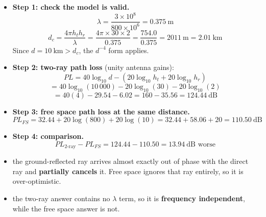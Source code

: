 \begin{itemize}
  \item \textbf{Step 1: check the model is valid.}
        \[ \lambda = \frac{3\times10^{8}}{800\times10^{6}} = 0.375\ \text{m} \]
        \[ d_c = \frac{4\pi h_t h_r}{\lambda} = \frac{4\pi \times 30 \times 2}{0.375}
              = \frac{754.0}{0.375} = 2011\ \text{m} = 2.01\ \text{km} \]
        Since $d = 10\ \text{km} > d_c$, the $d^{-4}$ form applies. \checkmark
  \item \textbf{Step 2: two-ray path loss} (unity antenna gains):
        \[ PL = 40\log_{10} d - \left(20\log_{10} h_t + 20\log_{10} h_r\right) \]
        \[ = 40\log_{10}(10\,000) - 20\log_{10}(30) - 20\log_{10}(2) \]
        \[ = 40(4) - 29.54 - 6.02 = 160 - 35.56 = \boxed{124.44\ \text{dB}} \]
  \item \textbf{Step 3: free space path loss at the same distance.}
        \[ PL_{FS} = 32.44 + 20\log(800) + 20\log(10)
                   = 32.44 + 58.06 + 20 = \boxed{110.50\ \text{dB}} \]
  \item \textbf{Step 4: comparison.}
        \[ PL_{2\text{-ray}} - PL_{FS} = 124.44 - 110.50 = \boxed{13.94\ \text{dB} \text{ worse}} \]
  \item {} the ground-reflected ray arrives almost
        exactly out of phase with the direct ray and \textbf{partially cancels} it. Free space
        ignores that ray entirely, so it is over-optimistic.
  \item {} the two-ray answer contains no $\lambda$ term, so it is
        \textbf{frequency independent}, while the free space answer is not.
\end{itemize}

\hr

{\color{sub}\footnotesize {} }


